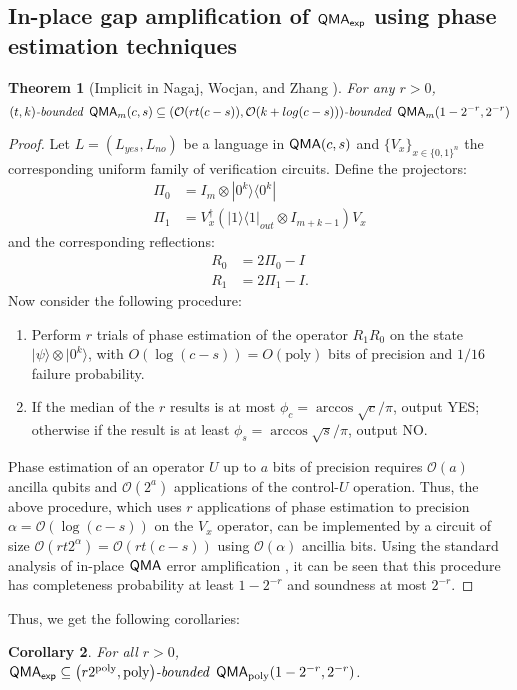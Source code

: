 \documentclass[11pt]{article}
\newtheorem{theorem}{Theorem}
\newtheorem{corollary}[theorem]{Corollary}
\theoremstyle{definition}
\theoremstyle{remark}
\newcommand\QMAexp{{\sf{QMA}_{exp}}}
\newcommand\bddQMA[5]{{\left(#1,#2\right)}\textit{-bounded }\QMA_{#3}(#4,#5)}
\newcommand{\ket}[1]{|#1\rangle}
\newcommand{\bra}[1]{\langle#1|}
\newcommand{\poly}{\textrm{poly}}
\begin{document}
\subsection{In-place gap amplification of $\QMAexp$ using phase estimation techniques}
\begin{theorem}[Implicit in Nagaj, Wocjan, and Zhang \cite{nwz11}] For any $r>0$, \[\bddQMA{t}{k}{m}{c}{s}\subseteq\bddQMA{\mathcal{O}(rt(c-s))}{\mathcal{O}(k+log(c-s))}{m}{1-2^{-r}}{2^{-r}}\]
\end{theorem}
\begin{proof}
	Let $L=(L_{yes}, L_{no})$ be a language in $\operatorname{\mathsf{QMA}}(c,s)$ and $\{V_x\}_{x\in\{0,1\}^n}$ the corresponding uniform family of verification circuits.
Define the projectors:
\begin{align}
\Pi_0 &= I_m \otimes \ket{0^k}\bra{0^k} \\
\Pi_1 &= V^\dagger_x \left(\ket{1}\bra{1}_{out} \otimes I_{m+k-1}\right) V_x
\end{align}
and the corresponding reflections:
\begin{align}
R_0 &= 2\Pi_0 - I \\
R_1 &= 2\Pi_1 - I.
\end{align}
Now consider the following procedure:
\begin{enumerate}
\item Perform $r$ trials of phase estimation of the operator $R_1R_0$ on the state $\ket{\psi}\otimes \ket{0^k}$, with $O(\log(c-s)) = O(\text{poly})$ bits of precision and $1/16$ failure probability. 
\item If the median of the $r$ results is at most $\phi_c = \arccos\sqrt{c}/\pi$, output YES; otherwise if the result is at least $\phi_s = \arccos\sqrt{s}/\pi$, output NO.
\end{enumerate}
Phase estimation of an operator $U$ up to $a$ bits of precision requires $\mathcal{O}(a)$ ancilla qubits and $\mathcal{O}(2^a)$ applications of the control-$U$ operation.  Thus, the above procedure, which uses $r$ applications of phase estimation to precision $\alpha=\mathcal{O}(\log(c-s))$ on the $V_x$ operator, can be implemented by a circuit of size $\mathcal{O}(rt2^{\alpha})=\mathcal{O}(rt(c-s))$ using $\mathcal{O}(\alpha)$ ancillia bits.
 Using the standard analysis of in-place $\operatorname{\mathsf{QMA}}$ error amplification \cite{mw05,nwz11}, it can be seen that this procedure has completeness probability at least $1-2^{-r}$ and soundness at most $2^{-r}$.
\end{proof}

Thus, we get the following corollaries:
\begin{corollary}\label{obvious1}For all $r>0$,
$\QMAexp\subseteq\bddQMA{r2^{\poly}}{\poly}{\poly}{1-2^{-r}}{2^{-r}}$.
\end{corollary}
\end{document}
